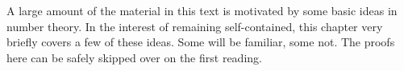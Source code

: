 A large amount of the material in this text is motivated by some basic ideas in number theory.
In the interest of remaining self-contained, this chapter very briefly covers a few of these ideas.
Some will be familiar, some not.
The proofs here can be safely skipped over on the first reading.
